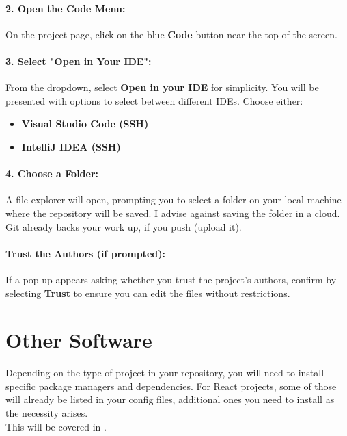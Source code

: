 \paragraph{2. Open the Code Menu:}
On the project page, click on the blue \textbf{Code} button near the top of the screen.
\paragraph{3. Select "Open in Your IDE":}
From the dropdown, select \textbf{Open in your IDE} for simplicity.
You will be presented with options to select between different IDEs. Choose either:
\begin{itemize}
    \item \textbf{Visual Studio Code (SSH)}
    \item \textbf{IntelliJ IDEA (SSH)}
\end{itemize}
\paragraph{4. Choose a Folder:}
A file explorer will open, prompting you to select a folder on your local machine where the repository will be saved.
I advise against saving the folder in a cloud.
Git already backs your work up, if you push (upload it).
\paragraph{Trust the Authors (if prompted):}
If a pop-up appears asking whether you trust the project’s authors, confirm by selecting \textbf{Trust} to ensure you can edit the files without restrictions.

\section{Other Software} \label{sec:other-software}
Depending on the type of project in your repository, you will need to install specific package managers and dependencies.
For React projects, some of those will already be listed in your config files, additional ones you
need to install as the necessity arises. \\ %
This will be covered in .


